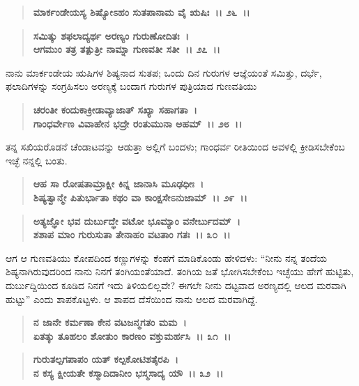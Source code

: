 \begin{verse}
\textbf{ಮಾರ್ಕಂಡೇಯಸ್ಯ ಶಿಷ್ಯೋಽಹಂ ಸುತಪಾನಾಮ ವೈ ಋಷಿಃ~।। ೨೬~।।} 
\end{verse}

\begin{verse}
\textbf{ಸಮಿತ್ಕು ಶಫಲಾದ್ಯರ್ಥ ಅರಣ್ಯಂ ಗುರುಣೋದಿತಃ~।}\\\textbf{ಆಗಮುಂ ತತ್ರ ತತ್ಪುತ್ರೀ ನಾಮ್ನಾ ಗುಣವತೀ ಸತೀ~।। ೨೭~।।}
\end{verse}

ನಾನು ಮಾರ್ಕಂಡೇಯ ಋಷಿಗಳ ಶಿಷ್ಯನಾದ ಸುತಪ; ಒಂದು ದಿನ ಗುರುಗಳ ಆಜ್ಞೆಯಂತೆ ಸಮಿತ್ತು, ದರ್ಭೆ, ಫಲಾದಿಗಳನ್ನು ಸಂಗ್ರಹಿಸಲು ಅರಣ್ಯಕ್ಕೆ ಬಂದಾಗ ಗುರುಗಳ ಪುತ್ರಿಯಾದ ಗುಣವತಿಯು

\begin{verse}
\textbf{ಚರಂತೀ ಕಂದುಕಾಕ್ರೀಡಾವ್ಯಾಜಾತ್ ಸಖ್ಯಾ ಸಹಾಗತಾ~।}\\\textbf{ಗಾಂಧರ್ವೇಣ ವಿವಾಹೇನ ಭದ್ರೇ ರಂತುಮುನಾ ಅಹಮ್~।। ೨೮~।।}
\end{verse}

ತನ್ನ ಸಖಿಯರೊಡನೆ ಚೆಂಡಾಟವನ್ನು ಆಡುತ್ತಾ ಅಲ್ಲಿಗೆ ಬಂದಳು; ಗಾಂಧರ್ವ ರೀತಿಯಿಂದ ಅವಳಲ್ಲಿ ಕ್ರೀಡಿಸಬೇಕೆಂಬ ಇಚ್ಛೆ ನನ್ನಲ್ಲಿ ಬಂತು.

\begin{verse}
\textbf{ಆಹ ಸಾ ರೋಷತಾಮ್ರಾಕ್ಷೀ ಕಿನ್ನ ಜಾನಾಸಿ ಮೂಢಧೀಃ~।}\\\textbf{ಶಿಷ್ಯತ್ವಾನ್ಮೇ ಪಿತುರ್ಭಾತಾ ಕಥಂ ವಾ ಕಾಂಕ್ಷಸೇಽನುಜಾಮ್~।। ೨೯~।। }
\end{verse}

\begin{verse}
\textbf{ಅತ್ಯಜ್ಞೋ ಭವ ದುರ್ಬುದ್ಧೇ ವಟೋ ಭೂಮ್ಯಾಂ ವನೇರ್ಬುದಮ್~।}\\\textbf{ಶಶಾಪ ಮಾಂ ಗುರುಸುತಾ ತೇನಾಹಂ ವಟತಾಂ ಗತಃ~।। ೩೦~।।}
\end{verse}

ಆಗ ಆ ಗುಣವತಿಯು ಕೋಪದಿಂದ ಕಣ್ಣುಗಳನ್ನು ಕೆಂಪಗೆ ಮಾಡಿಕೊಂಡು ಹೇಳಿದಳು: “ನೀನು ನನ್ನ ತಂದೆಯ ಶಿಷ್ಯನಾಗಿರುವುದರಿಂದ ನಾನು ನಿನಗೆ ತಂಗಿಯಂತೆಯಾದೆ. ತಂಗಿಯ ಜತೆ ಭೋಗಿಸಬೇಕೆಂಬ ಇಚ್ಛೆಯು ಹೇಗೆ ಹುಟ್ಟಿತು, ದುರ್ಬುದ್ದಿಯಿಂದ ಕೂಡಿದ ನಿನಗೆ ಇದು ತಿಳಿಯಲಿಲ್ಲವೇ? ಈಗಲೇ ನೀನು ದಟ್ಟವಾದ ಅರಣ್ಯದಲ್ಲಿ ಆಲದ ಮರವಾಗಿ ಹುಟ್ಟು” ಎಂದು ಶಾಪಕೊಟ್ಟಳು. ಆ ಶಾಪದ ದೆಸೆಯಿಂದ ನಾನು ಆಲದ ಮರವಾಗಿದ್ದೆ.

\begin{verse}
\textbf{ನ ಜಾನೇ ಕರ್ಮಣಾ ಕೇನ ವಟಜನ್ಮಗತಂ ಮಮ~।}\\\textbf{ಏತತ್ಕು ತೂಹಲಂ ಶೋತುಂ ಕಾರಣಂ ವಕ್ತುಮರ್ಹಸಿ~।। ೩೧~।।} 
\end{verse}

\begin{verse}
\textbf{ಗುರುತಲ್ಪಗಪಾಪಂ ಯತ್ ಕಲ್ಪಕೋಟಿಶತೈರಪಿ~।}\\\textbf{ನ ಕಸ್ಯ ಕ್ಷೀಯತೇ ಕಸ್ಮಾದಿದಾನೀಂ ಭಸ್ಮಸಾದ್ಯ ಯೌ~।। ೩೨~।। }
\end{verse}

